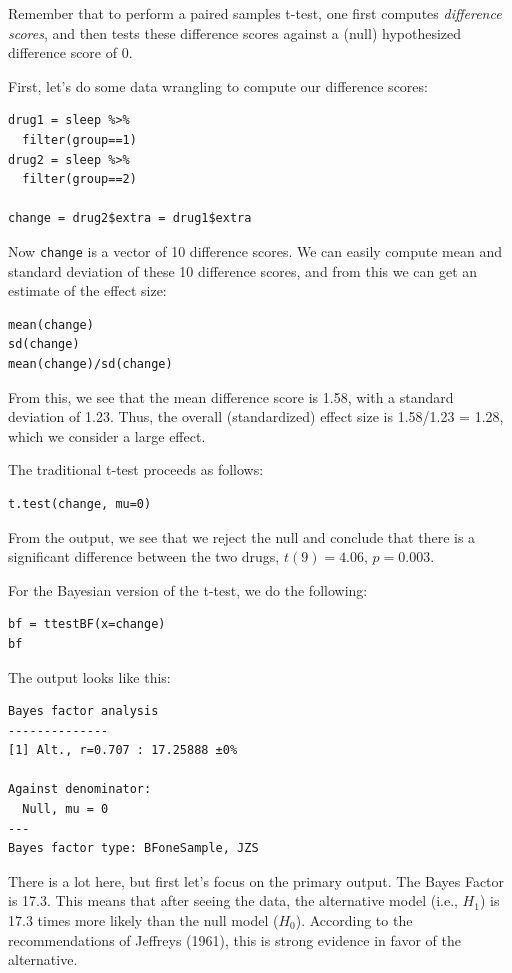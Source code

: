 \documentclass[11pt]{article}
\begin{document}
Remember that to perform a paired samples t-test, one first computes \emph{difference scores}, and then tests these difference scores against a (null) hypothesized difference score of 0.

First, let's do some data wrangling to compute our difference scores:

\begin{verbatim}
drug1 = sleep %>%
  filter(group==1)
drug2 = sleep %>%
  filter(group==2)

change = drug2$extra = drug1$extra
\end{verbatim}

Now \texttt{change} is a vector of 10 difference scores.  We can easily compute mean and standard deviation of these 10 difference scores, and from this we can get an estimate of the effect size:

\begin{verbatim}
mean(change)
sd(change)
mean(change)/sd(change)
\end{verbatim}

From this, we see that the mean difference score is 1.58, with a standard deviation of 1.23.  Thus, the overall (standardized) effect size is 1.58/1.23 = 1.28, which we consider a large effect.

The traditional t-test proceeds as follows:

\begin{verbatim}
t.test(change, mu=0)
\end{verbatim}

From the output, we see that we reject the null and conclude that there is a significant difference between the two drugs, $t(9)=4.06$, $p=0.003$.

For the Bayesian version of the t-test, we do the following:

\begin{verbatim}
bf = ttestBF(x=change)
bf
\end{verbatim}

The output looks like this:

\begin{verbatim}
Bayes factor analysis
--------------
[1] Alt., r=0.707 : 17.25888 ±0%

Against denominator:
  Null, mu = 0 
---
Bayes factor type: BFoneSample, JZS
\end{verbatim}

There is a lot here, but first let's focus on the primary output.  The Bayes Factor is 17.3.  This means that after seeing the data, the alternative model (i.e., $H_1$) is 17.3 times more likely than the null model ($H_0$).  According to the recommendations of Jeffreys (1961), this is strong evidence in favor of the alternative.
\end{document}
